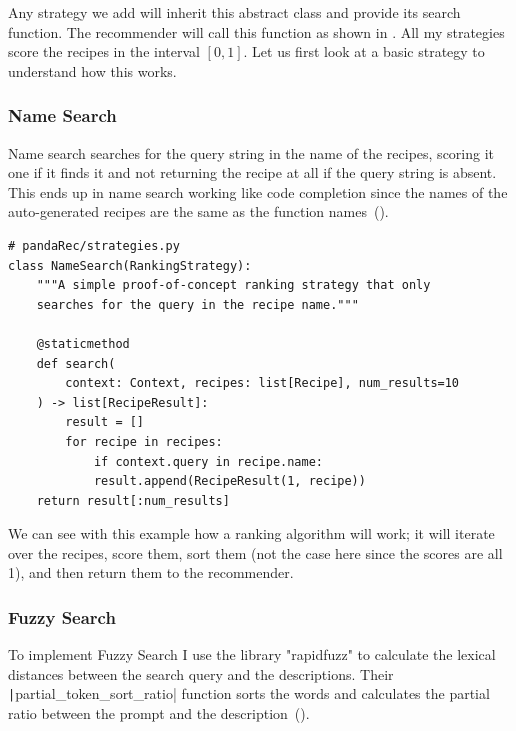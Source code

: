 \documentclass[
     12pt,                    %
     a4paper,             %
     BCOR=10mm,     %
     DIV=14,                 %
     listof=totoc,                    %
     bibliography=totoc,       %
     index=totoc,              %
     twoside,
     headsepline
     ]{scrreprt}
\begin{document}
Any strategy we add will inherit this abstract class and provide its search function. The recommender will call this function as shown in . All my strategies score the recipes in the interval \( \left[0,1\right] \). Let us first look at a basic strategy to understand how this works.


\clearpage

\subsubsection{Name Search}

Name search searches for the query string in the name of the recipes, scoring it one if it finds it and not returning the recipe at all if the query string is absent. This ends up in name search working like code completion since the names of the auto-generated recipes are the same as the function names~().

\begin{listing}[htb]
	\begin{verbatim}
# pandaRec/strategies.py
class NameSearch(RankingStrategy):
	"""A simple proof-of-concept ranking strategy that only
	searches for the query in the recipe name."""

	@staticmethod
	def search(
		context: Context, recipes: list[Recipe], num_results=10
	) -> list[RecipeResult]:
		result = []
		for recipe in recipes:
			if context.query in recipe.name:
			result.append(RecipeResult(1, recipe))
	return result[:num_results]
\end{verbatim}
\caption[Name Search]{Name Search.\label{list:namesearch}}
\end{listing}

We can see with this example how a ranking algorithm will work; it will iterate over the recipes, score them, sort them (not the case here since the scores are all 1), and then return them to the recommender.

\subsubsection{Fuzzy Search}

To implement Fuzzy Search I use the library "rapidfuzz" to calculate the lexical distances between the search query and the descriptions. Their \texttt|partial_token_sort_ratio| function sorts the words and calculates the partial ratio between the prompt and the description~().
\end{document}
